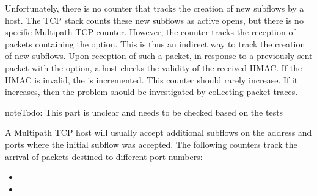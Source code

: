 \documentclass[letterpaper,10pt,english]{sphinxmanual}
\begin{document}
\sphinxAtStartPar
Unfortunately, there is no counter that tracks the creation of new subflows
by a host. The TCP stack counts these new subflows as active opens, but
there is no specific Multipath TCP counter. However, the
 counter tracks the reception of 
packets containing the  option. This is thus an indirect
way to track the creation of new subflows. Upon reception of such a
packet, in response to a previously sent  packet with the 
option, a host checks the validity of the received HMAC. If the HMAC is
invalid, the  is incremented. This counter
should rarely increase. If it increases, then the problem should be
investigated by collecting packet traces.
\def\sphinxLiteralBlockLabel{\label{\detokenize{nstat-mptcp:id9}}}
\begin{sphinxVerbatim}[commandchars=\\\{\}]
\end{sphinxVerbatim}

\begin{sphinxadmonition}{note}{\label{\detokenize{nstat-mptcp:id3}}Todo:}
\sphinxAtStartPar
This part is unclear and needs to be checked based on the tests
\end{sphinxadmonition}

\sphinxAtStartPar
A Multipath TCP host will usually accept additional subflows on the address
and ports where the initial subflow was accepted. The following counters
track the arrival of packets destined to different port numbers:
\begin{itemize}
\item {} 
\sphinxAtStartPar
{}

\item {} 
\sphinxAtStartPar
{}

\end{itemize}
\end{document}
